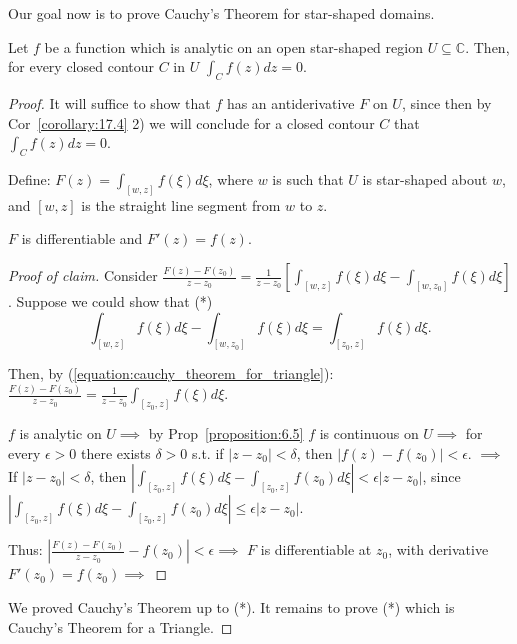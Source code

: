 Our goal now is to prove Cauchy's Theorem for star-shaped domains.
\begin{theorem} \label{theorem:18.1}
    Let $f$ be a function which is analytic on an open star-shaped region $U \subseteq \mathbb{C}$. 
    Then, for every closed contour $C$ in $U$ $\int_C f(z) dz = 0$.
\end{theorem}
\begin{proof}
    
    It will suffice to show that $f$ has an antiderivative $F$ on $U$, since then by 
    Cor~\ref{corollary:17.4} 2) we will conclude for a closed contour $C$ that $\int_C f(z) dz = 0$.
    
    Define: $F(z) = \int_{[w, z]} f(\xi) d\xi$, where $w$ is such that $U$ is star-shaped 
    about $w$, and $[w, z]$ is the straight line segment from $w$ to $z$.
    
    \begin{claim}
                $F$ is differentiable and $F'(z) = f(z)$.
    \end{claim}
        \begin{proof}[Proof of claim]
            Consider $\frac{F(z) - F(z_0)}{z - z_0} = \frac{1}{z-z_0} [\int_{[w, z]} f(\xi) d\xi - \int_{[w, z_0]} f(\xi) d\xi]$.
            Suppose we could show that (*) 
            \begin{equation}\label{equation:cauchy_theorem_for_triangle}
            \int_{[w, z]} f(\xi) d\xi - \int_{[w, z_0]} f(\xi) d\xi = \int_{[z_0, z]} f(\xi) d\xi. \tag{*}
            \end{equation}
            
            Then, by (\ref{equation:cauchy_theorem_for_triangle}): $\frac{F(z) - F(z_0)}{z - z_0} = \frac{1}{z-z_0} \int_{[z_0, z]} f(\xi) d\xi$.
            
            $f$ is analytic on $U \implies$ by Prop~\ref{proposition:6.5} $f$ is continuous on $U \implies$ for every $\epsilon > 0$ there 
            exists $\delta > 0$ s.t. if $|z - z_0| < \delta$, then $|f(z) - f(z_0)| < \epsilon$.
            $\implies$ If $|z - z_0| < \delta$, then $|\int_{[z_0, z]} f(\xi) d\xi - \int_{[z_0, z]} f(z_0) d\xi| < \epsilon |z - z_0|$, 
            since $|\int_{[z_0, z]} f(\xi) d\xi - \int_{[z_0, z]} f(z_0) d\xi| \leq \epsilon |z - z_0|$.
            
            Thus: $|\frac{F(z) - F(z_0)}{z - z_0} - f(z_0)| < \epsilon \implies$ $F$ is differentiable at $z_0$, 
            with derivative $F'(z_0) = f(z_0) \implies$ 
        \end{proof}
    We proved Cauchy's Theorem up to (*). It remains to prove (*) which is Cauchy's Theorem for a Triangle.
\end{proof}

